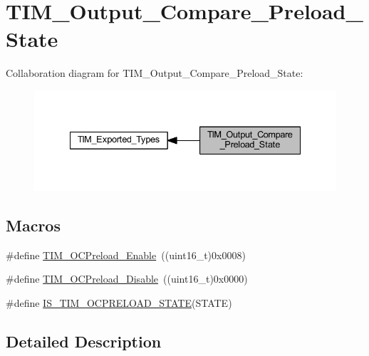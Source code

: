 \hypertarget{group___t_i_m___output___compare___preload___state}{}\section{T\+I\+M\+\_\+\+Output\+\_\+\+Compare\+\_\+\+Preload\+\_\+\+State}
\label{group___t_i_m___output___compare___preload___state}
Collaboration diagram for T\+I\+M\+\_\+\+Output\+\_\+\+Compare\+\_\+\+Preload\+\_\+\+State\+:
\nopagebreak
\begin{figure}[H]
\begin{center}
\leavevmode
\includegraphics[width=335pt]{group___t_i_m___output___compare___preload___state}
\end{center}
\end{figure}
\subsection*{Macros}
\begin{DoxyCompactItemize}
\item 
\#define \hyperlink{group___t_i_m___output___compare___preload___state_gad647db2e7a89bd6db3c787680afccf8f}{T\+I\+M\+\_\+\+O\+C\+Preload\+\_\+\+Enable}~((uint16\+\_\+t)0x0008)
\item 
\#define \hyperlink{group___t_i_m___output___compare___preload___state_ga0cbcc3c4d90d61d85550db2173737ed6}{T\+I\+M\+\_\+\+O\+C\+Preload\+\_\+\+Disable}~((uint16\+\_\+t)0x0000)
\item 
\#define \hyperlink{group___t_i_m___output___compare___preload___state_ga48cc07c5e87b5fd7549b7668f1598ab5}{I\+S\+\_\+\+T\+I\+M\+\_\+\+O\+C\+P\+R\+E\+L\+O\+A\+D\+\_\+\+S\+T\+A\+TE}(S\+T\+A\+TE)
\end{DoxyCompactItemize}


\subsection{Detailed Description}


